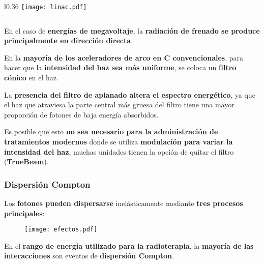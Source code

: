 \documentclass[aspectratio=169,xcolor=dvipsnames,t]{beamer}
\begin{document}
\begin{frame}

    \vspace{-0.3cm}

    \begin{wrapfigure}{l}{0.36\textwidth}
        \centering
        \texttt{[image: linac.pdf]}
    \end{wrapfigure}

    $\quad$

    \vspace{-0.3cm}

    En el caso de \textbf{energías de megavoltaje}, la \textbf{radiación de frenado se produce principalmente en dirección directa}.

    En la \textbf{mayoría de los aceleradores de arco en C convencionales}, para hacer que la \textbf{intensidad del haz sea más uniforme}, se coloca un \textbf{filtro cónico} en el haz.

    La \textbf{presencia del filtro de aplanado altera el espectro energético}, ya que el haz que atraviesa la parte central más gruesa del filtro tiene una mayor proporción de fotones de baja energía absorbidos.

    Es posible que esto \textbf{no sea necesario para la administración de tratamientos modernos} donde se utiliza \textbf{modulación para variar la intensidad del haz}, muchas unidades tienen la opción de quitar el filtro (\textbf{TrueBeam}).

\end{frame}

\begin{frame}

    \frametitle{Dispersión Compton}

    Los \textbf{fotones pueden dispersarse} inelásticamente mediante \textbf{tres procesos principales}:

    \begin{figure}
        \centering
        \texttt{[image: efectos.pdf]}
    \end{figure}

    En el \textbf{rango de energía utilizado para la radioterapia}, la \textbf{mayoría de las interacciones} son eventos de \textbf{dispersión Compton}.

\end{frame}
\end{document}
